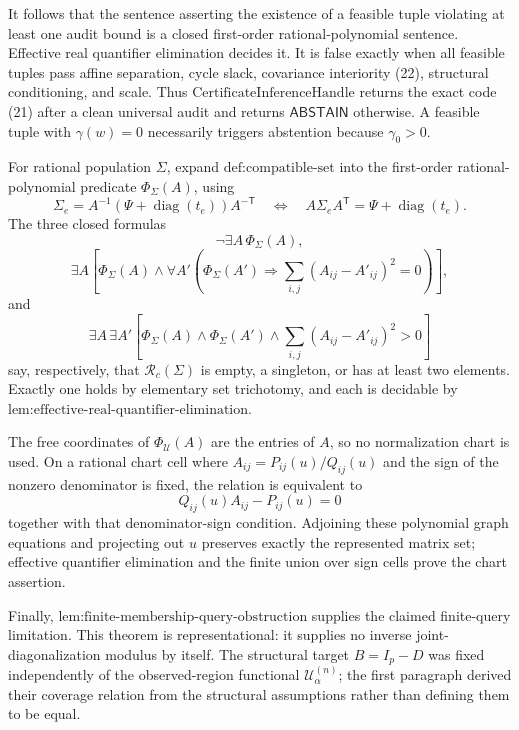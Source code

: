 It follows that the sentence asserting the existence of a feasible tuple violating at least one audit bound is a closed first-order rational-polynomial sentence. Effective real quantifier elimination decides it. It is false exactly when all feasible tuples pass affine separation, cycle slack, covariance interiority (22), structural conditioning, and scale. Thus \(\text{CertificateInferenceHandle}\) returns the exact code (21) after a clean universal audit and returns \(\mathsf{ABSTAIN}\) otherwise. A feasible tuple with \(\gamma(w)=0\) necessarily triggers abstention because \(\gamma_0>0\).

For rational population \(\Sigma\), expand \(\text{def:compatible-set}\) into the first-order rational-polynomial predicate \(\Phi_\Sigma(A)\), using
\[
\Sigma_e=A^{-1}(\Psi+\operatorname{diag}(t_e))A^{-\mathsf T}
\quad\Longleftrightarrow\quad
A\Sigma_eA^{\mathsf T}=\Psi+\operatorname{diag}(t_e).
\]
The three closed formulas
\[
\neg\exists A\,\Phi_\Sigma(A),
\]
\[
\exists A\left[\Phi_\Sigma(A)\wedge
\forall A'\left(\Phi_\Sigma(A')\Rightarrow
\sum_{i,j}(A_{ij}-A'_{ij})^2=0\right)\right],
\]
and
\[
\exists A\,\exists A'\left[\Phi_\Sigma(A)\wedge\Phi_\Sigma(A')\wedge
\sum_{i,j}(A_{ij}-A'_{ij})^2>0\right]
\]
say, respectively, that \(\mathcal R_c(\Sigma)\) is empty, a singleton, or has at least two elements. Exactly one holds by elementary set trichotomy, and each is decidable by \(\text{lem:effective-real-quantifier-elimination}\).

The free coordinates of \(\Phi_{\mathcal U}(A)\) are the entries of \(A\), so no normalization chart is used. On a rational chart cell where \(A_{ij}=P_{ij}(u)/Q_{ij}(u)\) and the sign of the nonzero denominator is fixed, the relation is equivalent to
\[
Q_{ij}(u)A_{ij}-P_{ij}(u)=0
\]
together with that denominator-sign condition. Adjoining these polynomial graph equations and projecting out \(u\) preserves exactly the represented matrix set; effective quantifier elimination and the finite union over sign cells prove the chart assertion.

Finally, \(\text{lem:finite-membership-query-obstruction}\) supplies the claimed finite-query limitation. This theorem is representational: it supplies no inverse joint-diagonalization modulus by itself. The structural target \(B=I_p-D\) was fixed independently of the observed-region functional \(\mathcal U^{(n)}_\alpha\); the first paragraph derived their coverage relation from the structural assumptions rather than defining them to be equal.